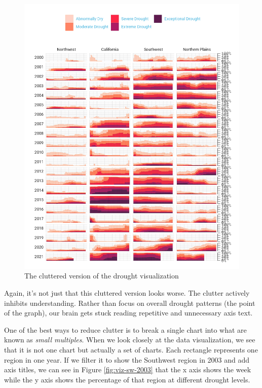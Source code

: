 \documentclass[
]{book}
\begin{document}
\begin{figure}
\includegraphics[width=1\linewidth]{data-viz_files/figure-latex/cluttered-viz-1} \caption{The cluttered version of the drought visualization}\label{fig:cluttered-viz}
\end{figure}

Again, it's not just that this cluttered version looks worse. The clutter actively inhibits understanding. Rather than focus on overall drought patterns (the point of the graph), our brain gets stuck reading repetitive and unnecessary axis text.

One of the best ways to reduce clutter is to break a single chart into what are known as \emph{small multiples}. When we look closely at the data visualization, we see that it is not one chart but actually a set of charts. Each rectangle represents one region in one year. If we filter it to show the Southwest region in 2003 and add axis titles, we can see in Figure \ref{fig:viz-sw-2003} that the x axis shows the week while the y axis shows the percentage of that region at different drought levels.
\end{document}
